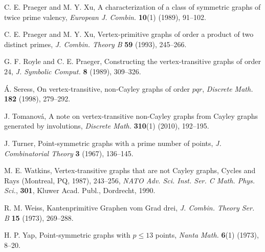 \documentclass{amsart}
\begin{document}
\begin{thebibliography}{0}
C. E. Praeger and M. Y. Xu, A characterization of a class of symmetric graphs of twice prime valency, \textit{European J. Combin.} \textbf{10}(1) (1989), 91--102. 

C. E. Praeger and M. Y. Xu, Vertex-primitive graphs of order a product of two distinct primes, \textit{J. Combin. Theory B} \textbf{59} (1993), 245--266.

G. F. Royle and C. E. Praeger, Constructing the vertex-transitive graphs of order $24$, \textit{J. Symbolic Comput.} \textbf{8} (1989), 309--326.

\'{A}. Seress, On vertex-transitive, non-Cayley graphs of order $pqr$, \textit{Discrete Math.} \textbf{182} (1998), 279--292.

J. Tomanov\'{a}, A note on vertex-transitive non-Cayley graphs from Cayley graphs generated by involutions, \textit{Discrete Math.} \textbf{310}(1) (2010), 192--195. 

J. Turner, Point-symmetric graphs with a prime number of points, \textit{J. Combinatorial Theory} \textbf{3} (1967), 136--145.

M. E. Watkins, Vertex-transitive graphs that are not Cayley graphs, Cycles and Rays (Montreal, PQ, 1987), 243--256, \textit{NATO Adv. Sci. Inst. Ser. C Math. Phys. Sci.}, \textbf{301}, Kluwer Acad. Publ., Dordrecht, 1990.

R. M. Weiss, Kantenprimitive Graphen vom Grad drei,\textit{ J. Combin. Theory Ser. B} \textbf{15} (1973), 269--288.

H. P. Yap, Point-symmetric graphs with $p\leq13$ points, \textit{Nanta Math.} \textbf{6}(1) (1973), 8--20.
\end{thebibliography}
\end{document}
